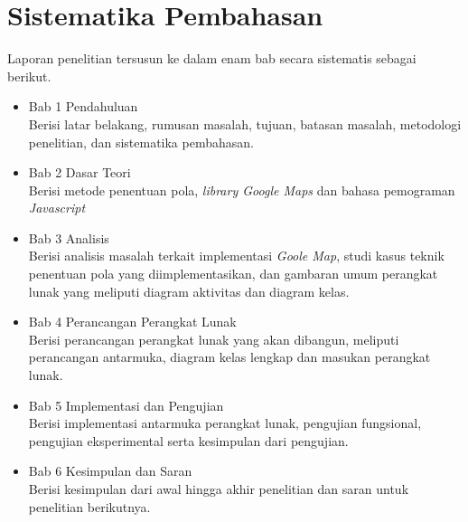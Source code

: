 \section{Sistematika Pembahasan}
\label{sec:sispem}
Laporan penelitian tersusun ke dalam enam bab secara sistematis sebagai berikut.
\begin{itemize}
    \item Bab 1 Pendahuluan\\
    Berisi latar belakang, rumusan masalah, tujuan, batasan masalah, metodologi penelitian, dan sistematika pembahasan.
   
   \item Bab 2 Dasar Teori\\
    Berisi  metode penentuan pola, \textit{library Google Maps} dan bahasa pemograman \textit{Javascript}
   
    \item Bab 3 Analisis\\
    Berisi analisis masalah terkait implementasi \textit{Goole Map}, studi kasus teknik penentuan pola yang diimplementasikan, dan gambaran umum perangkat lunak yang meliputi diagram aktivitas dan diagram kelas.
  
    \item Bab 4 Perancangan Perangkat Lunak\\
    Berisi perancangan perangkat lunak yang akan dibangun, meliputi perancangan antarmuka,
diagram kelas lengkap dan masukan perangkat lunak.
    
    \item Bab 5 Implementasi dan Pengujian\\
Berisi implementasi antarmuka perangkat lunak, pengujian fungsional, pengujian eksperimental
serta kesimpulan dari pengujian.
   
    \item Bab 6 Kesimpulan dan Saran\\
    Berisi kesimpulan dari awal hingga akhir penelitian dan saran untuk penelitian berikutnya.
\end{itemize}